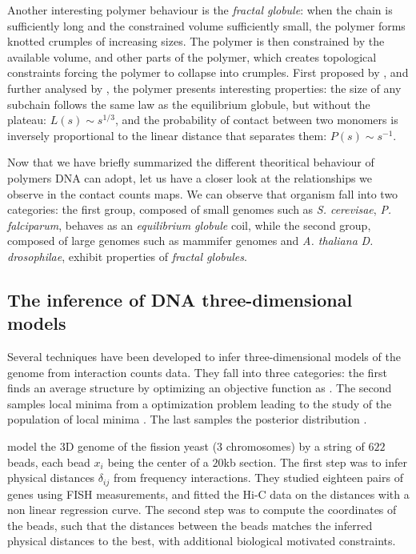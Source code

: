 Another interesting polymer behaviour is the \textit{fractal globule}: when
the chain is sufficiently long and the constrained volume sufficiently small,
the polymer forms knotted crumples of increasing sizes. The polymer is then
constrained by the available volume, and other parts of the polymer, which
creates topological constraints forcing the polymer to collapse into crumples.
First proposed by \citet{grosberg:role}, and further analysed by
\citet{mirny:fractal}, the polymer presents interesting properties: the size
of any subchain follows the same law as the equilibrium globule, but without
the plateau: $L(s) \sim s^{1/3}$, and the probability of contact between two
monomers is inversely proportional to the linear distance that separates them:
$P(s) \sim s^{-1}$.

Now that we have briefly summarized the different theoritical behaviour of
polymers DNA can adopt, let us have a closer look at the relationships we
observe in the contact counts maps. We can observe that organism fall into two
categories: the first group, composed of small genomes such as \textit{S.
cerevisae}, \textit{P. falciparum}, behaves as an \textit{equilibrium globule}
coil, while the second group, composed of large genomes such as mammifer
genomes and \textit{A. thaliana} \textit{D. drosophilae}, exhibit properties
of \textit{fractal globules}.

\subsection{The inference of DNA three-dimensional models}


Several techniques have been developed to infer three-dimensional models of
the genome from interaction counts data. They fall into three categories: the
first finds an average structure by optimizing an objective function as
\citep{tanizawa:mapping, duan:three, ben-elazar:spatial}. The
second samples local minima from a optimization problem leading to the study
of the population of local minima \citep{bau:three-dimensional}. The last
samples the posterior distribution \citep{rousseau:three}.

\citet{tanizawa:mapping} model the 3D genome of the fission yeast (3
chromosomes) by a string of $622$ beads, each bead $x_i$ being the center of a
$20$kb section. The first step was to infer physical distances $\delta_{ij}$
from frequency interactions. They studied eighteen pairs of genes using FISH
measurements, and fitted the Hi-C data on the distances with a non linear
regression curve. The second step was to compute the coordinates of the beads,
such that the distances between the beads matches the inferred physical
distances to the best, with additional biological motivated constraints.

